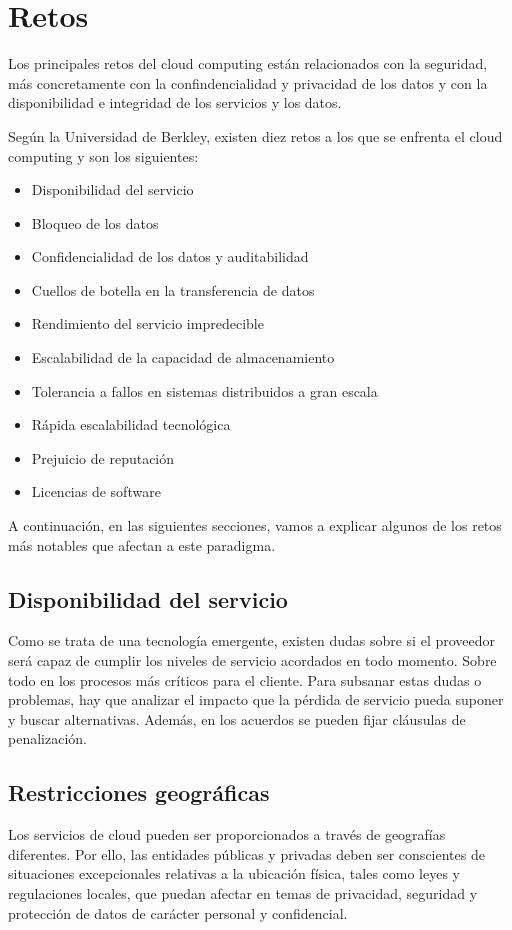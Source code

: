 \documentclass[a4paper, 12pt]{report}
\begin{document}
\section{Retos}
\begin{justify}
Los principales retos del cloud computing están relacionados con la seguridad, m\'as concretamente con la confindencialidad y privacidad de los datos y con la disponibilidad e integridad de los servicios y los datos.

Seg\'un la Universidad de Berkley, existen diez retos a los que se enfrenta el cloud computing y son los siguientes:
				\begin{itemize}
						\item{}Disponibilidad del servicio
						\item{}Bloqueo de los datos
						\item{}Confidencialidad de los datos y auditabilidad
						\item{}Cuellos de botella en la transferencia de datos
						\item{}Rendimiento del servicio impredecible
						\item{}Escalabilidad de la capacidad de almacenamiento
						\item{}Tolerancia a fallos en sistemas distribuidos a gran escala
						\item{}R\'apida escalabilidad tecnológica
						\item{}Prejuicio de reputaci\'on
						\item{}Licencias de software
				\end{itemize}
A continuación, en las siguientes secciones, vamos a explicar algunos de los
retos más notables que afectan a este paradigma.
\end{justify}
\newpage
\subsection{Disponibilidad del servicio}
\begin{justify}
Como se trata de una tecnolog\'ia emergente, existen dudas sobre si el proveedor ser\'a capaz de cumplir los niveles de servicio acordados en todo momento. Sobre todo en los procesos m\'as cr\'iticos para el cliente. Para subsanar estas dudas o problemas, hay que analizar el impacto que la pérdida de servicio pueda suponer y buscar alternativas. Además, en los acuerdos se pueden fijar cl\'ausulas de penalizaci\'on.
\end{justify}
\subsection{Restricciones geogr\'aficas}
\begin{justify}
Los servicios de cloud pueden ser proporcionados a trav\'es de geografías diferentes. Por ello, las entidades p\'ublicas y privadas deben ser conscientes de situaciones excepcionales relativas a la  ubicación f\'isica, tales como leyes y regulaciones locales, que puedan afectar en temas de privacidad, seguridad y protecci\'on de datos de car\'acter personal y confidencial.
\end{justify}
\end{document}
